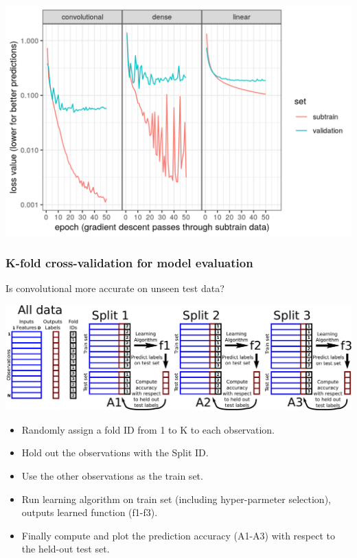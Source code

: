 \documentclass{beamer}
\begin{document}
\begin{frame}
  \includegraphics[width=\textwidth]{figure-validation-loss-three}
\end{frame}

\begin{frame}
  \frametitle{K-fold cross-validation for model evaluation}
  Is convolutional more accurate on unseen test data?
  
  \includegraphics[width=\textwidth]{drawing-cross-validation}
  
  \begin{itemize}
  \item Randomly assign a fold ID from 1 to K to each observation.
  \item Hold out the observations with the Split ID.
  \item Use the other observations as the train set.
  \item Run learning algorithm on train set (including hyper-parmeter
    selection), outputs learned function (f1-f3).
  \item Finally compute and plot the prediction accuracy (A1-A3) with
    respect to the held-out test set.
  \end{itemize}
\end{frame}
\end{document}
